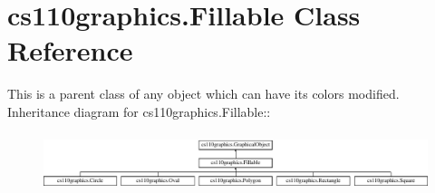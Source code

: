 \hypertarget{classcs110graphics_1_1Fillable}{
\section{cs110graphics.Fillable Class Reference}
\label{classcs110graphics_1_1Fillable}
}


This is a parent class of any object which can have its colors modified.  
Inheritance diagram for cs110graphics.Fillable::\begin{figure}[H]
\begin{center}
\leavevmode
\includegraphics[height=1.68844cm]{classcs110graphics_1_1Fillable}
\end{center}
\end{figure}
